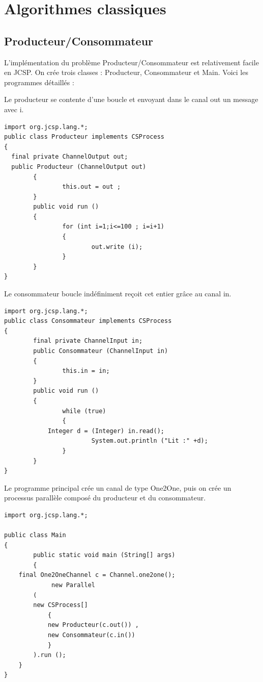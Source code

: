 \documentclass[a4paper,11pt,french]{report}
\begin{document}
\section{Algorithmes classiques}
\subsection{Producteur/Consommateur}

L'implémentation du problème Producteur/Consommateur est relativement facile en JCSP. On crée trois classes : Producteur, Consommateur et Main. Voici les programmes détaillés :

Le producteur se contente d'une boucle et envoyant dans le canal out un message avec i. 

\begin{lstlisting}[frame=trBL,title={Producteurs-Consommateurs: Producteur.java}]
import org.jcsp.lang.*;
public class Producteur implements CSProcess
{
  final private ChannelOutput out;
  public Producteur (ChannelOutput out)
        {
                this.out = out ;
        }
        public void run ()
        {
                for (int i=1;i<=100 ; i=i+1)
                {
                        out.write (i);
                }
        }
}
\end{lstlisting}

Le consommateur boucle indéfiniment reçoit cet entier grâce au canal in.

\begin{lstlisting}[frame=trBL,title={Producteurs-Consommateurs: Consommateur.java}]
import org.jcsp.lang.*;
public class Consommateur implements CSProcess
{
        final private ChannelInput in;
        public Consommateur (ChannelInput in)
        {
                this.in = in;
        }
        public void run ()
        {
                while (true)
                {
			Integer d = (Integer) in.read();
                        System.out.println ("Lit :" +d);
                }
        }
}
\end{lstlisting}

Le programme principal crée un canal de type One2One, puis on crée un processus parallèle composé du producteur et du consommateur.

\begin{lstlisting}[frame=trBL,title={Producteurs-Consommateurs: Main.java}]
import org.jcsp.lang.*;

public class Main
{
        public static void main (String[] args)
        {
	final One2OneChannel c = Channel.one2one();
             new Parallel
		(
		new CSProcess[]
			{
			new Producteur(c.out()) ,
			new Consommateur(c.in())
			} 
		).run ();
	}
}
\end{lstlisting}
\end{document}
